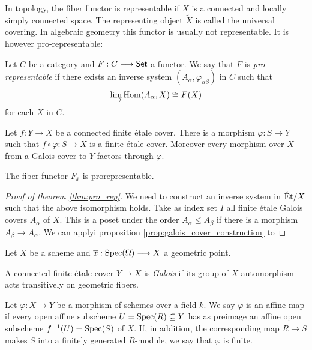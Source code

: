 \begin{remark}
	In topology, the fiber functor is representable if $X$ is a connected and locally simply connected space. The representing object $\tilde{X}$ is called the universal covering. In algebraic geometry this functor is usually not representable. It is however pro-representable:
\end{remark}

\begin{definition}
	Let $C$ be a category and $F: C \longrightarrow \mathsf{Set}$ a functor. We say that $F$ is \textit{pro-representable} if there exists an inverse system $(A_\alpha,\varphi_{\alpha \beta})$ in $C$ such that
	\[
		\varinjlim \operatorname{Hom}(A_\alpha, X) \cong F(X)
	\]
	for each $X$ in $C$.
\end{definition}

\begin{lemma}
	Let $f: Y \to X$ be a connected finite \'etale cover. There is a morphism $\varphi: S \to Y$ such that $f \circ \varphi: S \to X$ is a finite \'etale cover. Moreover every morphism over $X$ from a Galois cover to $Y$ factors through $\varphi$.
\end{lemma}

\begin{theorem}\label{thm:pro_rep}
	The fiber functor $F_{\overline{x}}$ is prorepresentable.
\end{theorem}

\begin{proof}[Proof of theorem \ref{thm:pro_rep}]
	We need to construct an inverse system in $\text{\'Et}/X$ such that the above isomorphism holds. Take as index set $I$ all finite \'etale Galois covers $A_\alpha$ of $X$. This is a poset under the order $A_\alpha \le A_\beta$ if there is a morphism $A_\beta \to A_\alpha$. We can applyi proposition \ref{prop:galois_cover_construction} to
\end{proof}

\begin{theorem}
	Let $X$ be a scheme and $\overline{x} : \operatorname{Spec}(\Omega) \longrightarrow X$ a geometric point.
\end{theorem}

\begin{definition}
	A connected finite \'etale cover $Y \to X$ is \textit{Galois} if its group of $X$-automorphism acts transitively on geometric fibers.
\end{definition}


\begin{definition}
	Let $\varphi: X \to Y$ be a morphism of schemes over a field $k$. We say $\varphi$ is an affine map if every open affine subscheme $U = \operatorname{Spec}(R) \subseteq Y$ has as preimage an affine open subscheme $f^{-1}(U) = \operatorname{Spec}(S)$ of $X$. If, in addition, the corresponding map $R \to S$ makes $S$ into a finitely generated $R$-module, we say that $\varphi$ is finite.
\end{definition}

